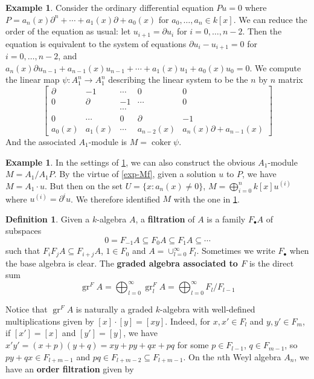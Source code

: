 \documentclass[11pt, a4paper]{article}
\theoremstyle{definition}
\newtheorem{example}[theorem]{Example}
\newtheorem{definition}[theorem]{Definition}
\newcommand{\gr}{\operatorname{gr}}
\newcommand{\coker}[0]{\operatorname{coker}}
\begin{document}
    \begin{example}\label{exp-general-ode}
        Consider the ordinary differential equation $Pu=0$ where $P=a_n(x)\partial^n+\cdots+a_1(x)\partial+a_0(x)$ for $a_0,\dots, a_n\in k[x]$. We can reduce the order of the equation as usual: let $u_{i+1}=\partial u_{i}$ for $i=0,\dots, n-2$. Then the equation is equivalent to the system of equations $\partial u_{i}-u_{i+1}=0$ for $i=0,\dots, n-2$, and $a_n(x)\partial u_{n-1}+a_{n-1}(x)u_{n-1}+\cdots+a_1(x)u_1+a_0(x)u_0=0$. We compute the linear map $\psi:A_1^n\to A_1^n$ describing the linear system to be the $n$ by $n$ matrix
        \[\begin{bmatrix}
            \partial & -1 &  \cdots & 0 & 0 \\
            0 & \partial & -1 & \cdots & 0 \\
            &  &\cdots & &\\
            0 & \cdots & 0 &\partial & -1\\
            a_0(x) & a_1(x) & \cdots & a_{n-2}(x) & a_n(x)\partial+a_{n-1}(x)
        \end{bmatrix}\]
        And the associated $A_1$-module is $M=\coker\psi$.
    \end{example}
    \begin{example}
        In the settings of \cref{exp-general-ode}, we can also construct the obvious $A_1$-module $M=A_1/A_1P$. By the virtue of \cref{exp-Mf}, given a solution $u$ to $P$, we have $M=A_1\cdot u$. But then on the set $U=\{x:a_n(x)\neq 0\}$, $M=\bigoplus_{i=0}^nk[x]u^{(i)}$ where $u^{(i)}=\partial^iu$. We therefore identified $M$ with the one in \cref{exp-general-ode}.
    \end{example}
    \begin{definition}
        Given a $k$-algebra $A$, a \textbf{filtration} of $A$ is a family $F_\bullet A$ of subspaces
        \[0=F_{-1}A\subseteq F_0A\subseteq F_1A\subseteq\cdots\]
        such that $F_iF_jA\subseteq F_{i+j}A$, $1\in F_0$ and $A=\cup_{l=0}^\infty F_l$. Sometimes we write $F_\bullet$ when the base algebra is clear. The \textbf{graded algebra associated to $F$} is the direct sum
        \[\gr^F A=\bigoplus_{l=0}^\infty\gr^F_lA=\bigoplus_{l=0}^\infty F_l/F_{l-1}\]
    \end{definition}
    Notice that $\gr^F A$ is naturally a graded $k$-algebra with well-defined multiplications given by $[x]\cdot[y]=[xy]$. Indeed, for $x, x'\in F_l$ and $y, y'\in F_m$, if $[x']=[x]$ and $[y']=[y]$, we have $x'y'=(x+p)(y+q)=xy+py+qx+pq$ for some $p\in F_{l-1}$, $q\in F_{m-1}$, so $py+qx\in F_{l+m-1}$ and $pq\in F_{l+m-2}\subseteq F_{l+m-1}$. On the $n$th Weyl algebra $A_n$, we have an \textbf{order filtration} given by
\end{document}

